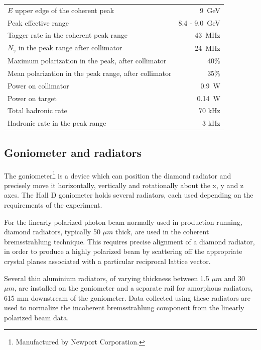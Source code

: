 \begin{table}[tbp]
\begin{center}
\begin{tabular}{|l|r|}
\hline\hline
$E$ upper edge of the coherent peak & 9~GeV \\
Peak effective range       & 8.4 - 9.0~GeV\\
Tagger rate in the coherent peak range & 43~MHz  \\
$N_{\gamma}$ in the peak range after collimator & 24~MHz  \\
Maximum polarization in the peak, after collimator & 40\% \\
Mean polarization in the peak range, after collimator & 35\% \\
Power on collimator & 0.9~W \\
Power on target & 0.14~W \\
Total hadronic rate & 70 kHz \\
Hadronic rate in the peak range & 3 kHz \\
\hline\hline
\end{tabular}
\end{center}
\end{table}


\subsection{Goniometer and radiators \label{sec:radiators}}
The goniometer\footnote{Manufactured by Newport Corporation.} is a device which can position the diamond radiator and precisely move it horizontally, vertically and rotationally about the x, y and z axes.
The Hall D goniometer holds several radiators, each used depending on the requirements of the experiment.

For the linearly polarized photon beam normally used in \GX{} production running, diamond radiators, typically 50 $\mu m$ thick, are used in the coherent bremsstrahlung technique.
This requires precise alignment of a diamond radiator, in order to produce a highly polarized beam by scattering off the appropriate crystal planes associated with a particular reciprocal lattice vector.

Several thin aluminium radiators, of varying thickness between 1.5 $\mu m$ and 30 $\mu m$, are installed on the goniometer and a separate rail for amorphous radiators, 615 mm downstream of the goniometer.
Data collected using these radiators are used to normalize the incoherent bremsstrahlung component from the linearly polarized beam data.

